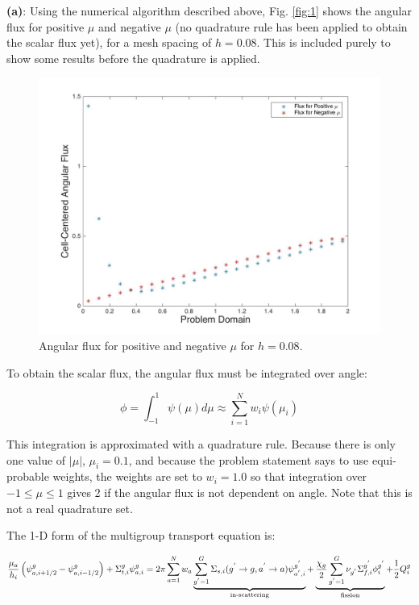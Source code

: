 \documentclass[10pt]{article}
\newcommand*\circled[1]{\tikz[baseline=(char.base)]{
            \node[shape=circle,draw,inner sep=2pt] (char) {#1};}}
\begin{document}
\textbf{(a)}: Using the numerical algorithm described above, Fig. \ref{fig:1} shows the angular flux for positive \(\mu\) and negative \(\mu\) (no quadrature rule has been applied to obtain the scalar flux yet), for a mesh spacing of \(h=0.08\). This is included purely to show some results before the quadrature is applied. 

\begin{figure}[H]
  \centering
  \includegraphics[width=12cm]{AngularFluxh08.jpg} %
  \caption{Angular flux for positive and negative \(\mu\) for \(h=0.08\).}
  \label{fig:real}
\end{figure}

To obtain the scalar flux, the angular flux must be integrated over angle:

\begin{equation}
\phi=\int_{-1}^{1}\psi(\mu)d\mu\approx\sum_{i=1}^{N}w_i\psi(\mu_i)
\end{equation}

This integration is approximated with a quadrature rule. Because there is only one value of \(|\mu|\), \(\mu_i=0.1\), and because the problem statement says to use equi-probable weights, the weights are set to \(w_i=1.0\) so that integration over \(-1\leq\mu\leq1\) gives 2 if the angular flux is not dependent on angle. Note that this is not a real quadrature set.






\circled{4} The 1-D form of the multigroup transport equation is:

\begin{equation}
\frac{\mu_a}{h_i}\left(\psi_{a,i+1/2}^g-\psi_{a,i-1/2}^g\right)+\Sigma_{t,i}^g\psi_{a,i}^g=2\pi\sum_{a=1}^{N}w_a\underbrace{\sum_{g^{'}=1}^G\Sigma_{s,i}(g^{'}\rightarrow g, a^{'}\rightarrow a)\psi_{a^{'},i}^{g^{'}}}_\text{in-scattering}+\underbrace{\frac{\chi_g}{2}\sum_{g^{'}=1}^{G}\nu_{g^{'}}\Sigma_{f,i}^{g^{'}}\phi_{i}^{g^{'}}}_\text{fission}+\frac{1}{2}Q_i^g\\
\end{equation}
\end{document}

